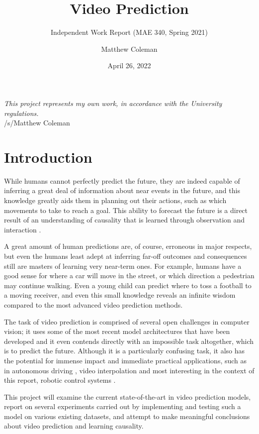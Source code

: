 \documentclass{scrartcl}
\title{Video Prediction}
\subtitle{Independent Work Report (MAE 340, Spring 2021)}
\author{Matthew Coleman}
\date{April 26, 2022}
\begin{document}
\maketitle

\vspace{8cm}
\Large
\textit{This project represents my own work, in accordance with the University regulations.} \\
\hspace*{\fill} \large /s/Matthew Coleman
\normalsize

\newpage
\tableofcontents
\newpage

\section{Introduction}
\label{sec:intro}

While humans cannot perfectly predict the future, they are indeed capable of
inferring a great deal of information about near events in the future, and this
knowledge greatly aids them in planning out their actions, such as which
movements to take to reach a goal. This ability to forecast the future is a
direct result of an understanding of causality that is learned through
observation and interaction \cite{human_learning_sequences}.

A great amount of human predictions are, of course, erroneous in major
respects, but even the humans least adept at inferring far-off outcomes and
consequences still are masters of learning very near-term ones. For example,
humans have a good sense for where a car will move in the street, or which
direction a pedestrian may continue walking. Even a young child can predict
where to toss a football to a moving receiver, and even this small knowledge
reveals an infinite wisdom compared to the most advanced video prediction
methods.

The task of video prediction is comprised of several open challenges in
computer vision; it uses some of the most recent model architectures that have
been developed and it even contends directly with an impossible task
altogether, which is to predict the future. Although it is a particularly
confusing task, it also has the potential for immense impact and immediate
practical applications, such as in autonomous driving \cite{eg_self_driving},
video interpolation \cite{eg_video_interp} and most interesting in the context
of this report, robotic control systems \cite{eg_robot_control}.

This project will examine the current state-of-the-art in video prediction
models, report on several experiments carried out by implementing and testing
such a model on various existing datasets, and attempt to make meaningful
conclusions about video prediction and learning causality.
\end{document}
